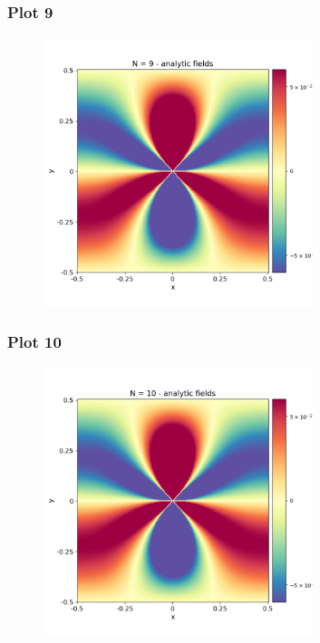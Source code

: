 \documentclass{beamer}
\begin{document}
\begin{frame}
    \frametitle{Plot 9}
    \begin{figure}[H]
        \centering
        \includegraphics[width=0.7\textwidth]{../stress_field_09.png}
    \end{figure}
\end{frame}

\begin{frame}
    \frametitle{Plot 10}
    \begin{figure}[H]
        \centering
        \includegraphics[width=0.7\textwidth]{../stress_field_10.png}
    \end{figure}
\end{frame}
\end{document}
